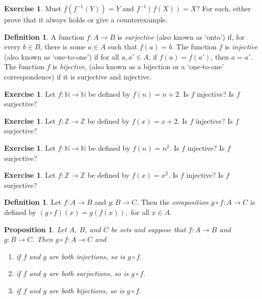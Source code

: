 \documentclass[11pt]{article}
\newtheorem{proposition}[theorem]{Proposition}
\theoremstyle{definition}
\newtheorem{definition}[theorem]{Definition}
\newtheorem{exercise}[theorem]{Exercise}
\numberwithin{equation}{subsection}
\begin{document}
\begin{exercise}
Must $f(f^{-1}(Y))=Y$ and $f^{-1}(f(X))=X?$ For each, either prove that it always holds or give a counterexample.
\end{exercise}


\begin{definition}  A function $f \colon A \rightarrow B$ is \emph{surjective} (also known as `onto') if, 
for every $b\in B$, there is some $a\in A$ such that $f(a) = b$.  The function $f$ is \emph{injective} (also known as `one-to-one') if for all $a, a' \in A$, if $f(a) = f(a')$, then $a = a'$.  The function $f$ is \emph{bijective}, (also known as a bijection or a `one-to-one' correspondence) if it is surjective and injective.
\end{definition}



\begin{exercise}
Let $f:{\mathbb N}\rightarrow {\mathbb N}$ be defined by $f(n)=n+2$.  Is $f$ injective?  Is $f$ surjective?
\end{exercise}

\begin{exercise}
Let $f:{\mathbb Z}\rightarrow {\mathbb Z}$ be defined by $f(x)=x+2$.  Is $f$ injective?  Is $f$ surjective?
\end{exercise}

\begin{exercise}
Let $f:{\mathbb N}\rightarrow {\mathbb N}$ be defined by $f(n)=n^2$.  Is $f$ injective?  Is $f$ surjective?
\end{exercise}

\begin{exercise}
Let $f:{\mathbb Z}\rightarrow {\mathbb Z}$ be defined by $f(x)=x^2$.  Is $f$ injective?  Is $f$ surjective?
\end{exercise}




\begin{definition}
Let $f:A\longrightarrow B$ and $g:B\longrightarrow C. $ Then the \emph{composition} $g\circ f: A\longrightarrow C$ is defined by $(g\circ f)(x)=g(f(x)),$ for all $x\in A.$ 
\end{definition}

\begin{proposition}  Let $A$, $B$, and $C$ be sets and suppose that $f:A\longrightarrow B$  and  $g:B\longrightarrow C.$  Then $g\circ f:A\longrightarrow C$ and
\begin{enumerate}
\item[a)] if $f$ and $g$ are both injections, so is $g\circ f.$
\item[b)] if $f$ and $g$ are both surjections, so is $g\circ f.$
\item[c)] if $f$ and $g$ are both bijections, so is $g\circ f.$
\end{enumerate}
\end{proposition} 
\end{document}
